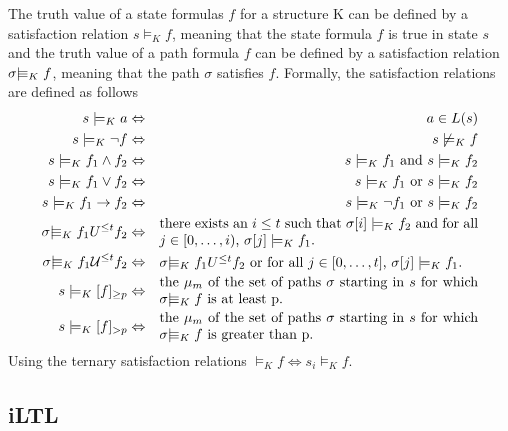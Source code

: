 The truth value of a state formulas $f$ for a structure K can be defined by a satisfaction relation $s\models_K f$, meaning that the state formula $f$ is true in state $s$ and the truth value of a path formula $f$ can be defined by a satisfaction relation $\sigma |\!\!\!\equiv_K f$, meaning that the path $\sigma$ satisfies $f$. Formally, the satisfaction relations are defined as follows
\begin{eqnarray*}
s\models_K a &\Leftrightarrow& a \in L(s)\\
s\models_K\neg f &\Leftrightarrow& s \not\models_K f\\
s\models_K f_1 \wedge f_2 &\Leftrightarrow& s\models_K f_1\mbox{ and }s\models_K f_2\\
s\models_K f_1 \vee   f_2 &\Leftrightarrow& s\models_K f_1\mbox{ or }s\models_K f_2\\
s\models_K f_1\rightarrow f_2 &\Leftrightarrow& s\models_K\neg f_1\mbox{ or }s\models_K f_2\\
\sigma\Models_K f_1 U^{\leq t} f_2 &\Leftrightarrow& \parbox{8cm}{there exists an $i\leq t$ such that $\sigma[i]\models_K f_2$ and for all $j\in[0,\ldots,i)$, $\sigma[j]\models_K f_1$.}\\
\sigma\Models_K f_1 {\cal U}^{\leq t} f_2 &\Leftrightarrow& \parbox{8cm}{$\sigma\Models_K f_1 U^{\leq t} f_2$ or for all $j\in[0,\ldots,t]$, $\sigma[j]\models_K f_1$.}\\
s\models_K[f]_{\geq p} &\Leftrightarrow&\parbox{8cm}{the $\mu_m$ of the set of paths $\sigma$ starting in $s$ for which $\sigma\Models_K f$ is at least p.}\\
s\models_K[f]_{> p} &\Leftrightarrow&\parbox{8cm}{the $\mu_m$ of the set of paths $\sigma$ starting in $s$ for which $\sigma\Models_K f$ is greater than p.}
\end{eqnarray*}
Using the ternary satisfaction relations $\models_K f \Leftrightarrow s_i \models_K f$.

\subsection{iLTL}
\label{sec:itlt}
